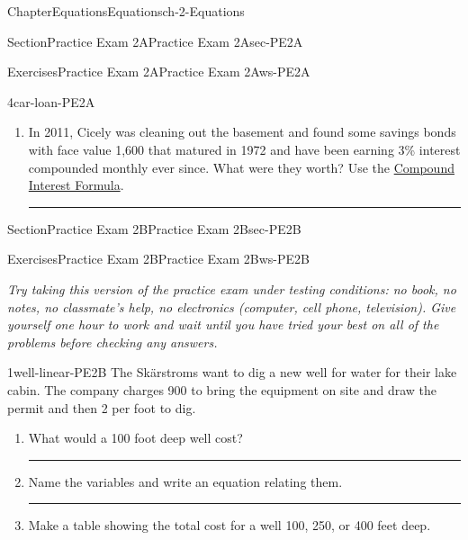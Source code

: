 \documentclass[twoside,11pt,]{book}
\newlength{\workspacestrutwidth}
\numberwithin{equation}{section}
\begin{document}
\begin{chapterptx}{Chapter}{Equations}{}{Equations}{}{}{ch-2-Equations}
\begin{sectionptx}{Section}{Practice Exam 2A}{}{Practice Exam 2A}{}{}{sec-PE2A}
\begin{exercises-subsection-numberless}{Exercises}{Practice Exam 2A}{}{Practice Exam 2A}{}{}{ws-PE2A}
\begin{divisionexercise}{4}{}{}{car-loan-PE2A}
\begin{enumerate}[label=(\alph*),ref=\alph*]
\par\rule{\workspacestrutwidth}{1.25in}%
\item{}In 2011, Cicely was cleaning out the basement and found some savings bonds with face value \textdollar{}1,600 that matured in 1972 and have been earning 3\% interest compounded monthly ever since. What were they worth? Use the \hyperref[compound-interest-formula]{Compound Interest Formula}.%
\par\rule{\workspacestrutwidth}{1.25in}%
\end{enumerate}%
\end{divisionexercise}%
\end{exercises-subsection-numberless}
\end{sectionptx}
%
%
\typeout{************************************************}
\typeout{************************************************}
%
\begin{sectionptx}{Section}{Practice Exam 2B}{}{Practice Exam 2B}{}{}{sec-PE2B}
%
%
\typeout{************************************************}
\typeout{************************************************}
%
\begin{exercises-subsection-numberless}{Exercises}{Practice Exam 2B}{}{Practice Exam 2B}{}{}{ws-PE2B}
\begin{introduction}{}%
\emph{Try taking this version of the practice exam under testing conditions: no book, no notes, no classmate's help, no electronics (computer, cell phone, television). Give yourself one hour to work and wait until you have tried your best on all of the problems before checking any answers.}%
\end{introduction}%
\begin{divisionexercise}{1}{}{}{well-linear-PE2B}%
The Skärstroms want to dig a new well for water for their lake cabin. The company charges \textdollar{}900 to bring the equipment on site and draw the permit and then \textdollar{}2 per foot to dig.%
\begin{enumerate}[label=(\alph*),ref=\alph*]%
\item{}What would a 100 foot deep well cost?%
\par\rule{\workspacestrutwidth}{1in}%
\item{}Name the variables and write an equation relating them.%
\par\rule{\workspacestrutwidth}{2in}%
\item{}Make a table showing the total cost for a well 100, 250, or 400 feet deep.%

\end{enumerate}
\end{divisionexercise}
\end{exercises-subsection-numberless}
\end{sectionptx}
\end{chapterptx}
\end{document}

